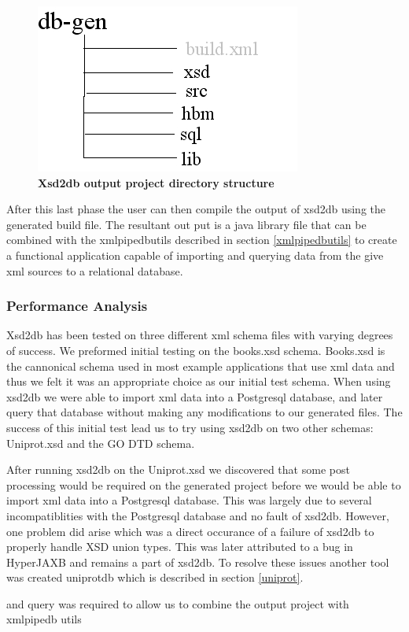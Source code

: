 \begin{figure}[htbp]
\begin{center}
\includegraphics[scale=0.8]{./Images/xsd2dbStructure.jpg}
\caption{{\bf Xsd2db output project directory structure}}
\label{xsd2dbStructure}
\end{center}
\end{figure}

After this last phase the user can then compile the output of xsd2db using the generated build file.  The resultant out put is a java library file that can be combined with the xmlpipedbutils described in section \ref{xmlpipedbutils} to create a functional application capable of importing and querying data from the give xml sources to a relational database.

\subsubsection{Performance Analysis}
Xsd2db has been tested on three different xml schema files with varying degrees of success.  We preformed initial testing on the books.xsd schema.  Books.xsd is the cannonical schema used in most example applications that use xml data and thus we felt it was an appropriate choice as our initial test schema.  When using xsd2db we were able to import xml data into a Postgresql database, and later query that database without making any modifications to our generated files.  The success of this initial test lead us to try using xsd2db on two other schemas: Uniprot.xsd and the GO DTD schema.  

After running xsd2db on the Uniprot.xsd we discovered that some post processing would be required on the generated project before we would be able to import xml data into a Postgresql database.  This was largely due to several incompatiblities with the Postgresql database and no fault of xsd2db.  However, one problem did arise which was a direct occurance of a failure of xsd2db to properly handle XSD union types.  This was later attributed to a bug in HyperJAXB and remains a part of xsd2db.  To resolve these issues another tool was created uniprotdb which is described in section \ref{uniprot}.  

and query was required to allow us to combine the output project with xmlpipedb utils       




